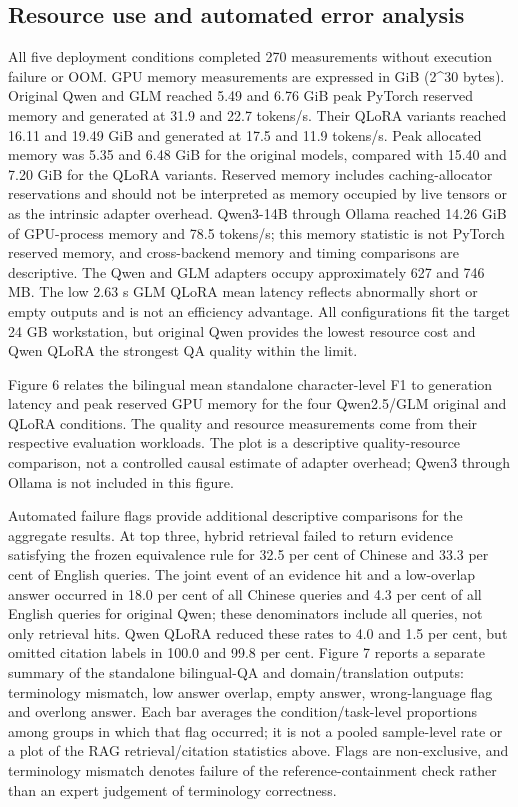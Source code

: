 \subsection{Resource use and automated error analysis}

All five deployment conditions completed 270 measurements without execution failure or OOM. GPU memory measurements are expressed in GiB (2\textasciicircum{}30 bytes). Original Qwen and GLM reached 5.49 and 6.76 GiB peak PyTorch reserved memory and generated at 31.9 and 22.7 tokens/s. Their QLoRA variants reached 16.11 and 19.49 GiB and generated at 17.5 and 11.9 tokens/s. Peak allocated memory was 5.35 and 6.48 GiB for the original models, compared with 15.40 and 7.20 GiB for the QLoRA variants. Reserved memory includes caching-allocator reservations and should not be interpreted as memory occupied by live tensors or as the intrinsic adapter overhead. Qwen3-14B through Ollama reached 14.26 GiB of GPU-process memory and 78.5 tokens/s; this memory statistic is not PyTorch reserved memory, and cross-backend memory and timing comparisons are descriptive. The Qwen and GLM adapters occupy approximately 627 and 746 MB. The low 2.63 s GLM QLoRA mean latency reflects abnormally short or empty outputs and is not an efficiency advantage. All configurations fit the target 24 GB workstation, but original Qwen provides the lowest resource cost and Qwen QLoRA the strongest QA quality within the limit.

Figure 6 relates the bilingual mean standalone character-level F1 to generation latency and peak reserved GPU memory for the four Qwen2.5/GLM original and QLoRA conditions. The quality and resource measurements come from their respective evaluation workloads. The plot is a descriptive quality-resource comparison, not a controlled causal estimate of adapter overhead; Qwen3 through Ollama is not included in this figure.

Automated failure flags provide additional descriptive comparisons for the aggregate results. At top three, hybrid retrieval failed to return evidence satisfying the frozen equivalence rule for 32.5 per cent of Chinese and 33.3 per cent of English queries. The joint event of an evidence hit and a low-overlap answer occurred in 18.0 per cent of all Chinese queries and 4.3 per cent of all English queries for original Qwen; these denominators include all queries, not only retrieval hits. Qwen QLoRA reduced these rates to 4.0 and 1.5 per cent, but omitted citation labels in 100.0 and 99.8 per cent. Figure 7 reports a separate summary of the standalone bilingual-QA and domain/translation outputs: terminology mismatch, low answer overlap, empty answer, wrong-language flag and overlong answer. Each bar averages the condition/task-level proportions among groups in which that flag occurred; it is not a pooled sample-level rate or a plot of the RAG retrieval/citation statistics above. Flags are non-exclusive, and terminology mismatch denotes failure of the reference-containment check rather than an expert judgement of terminology correctness.


